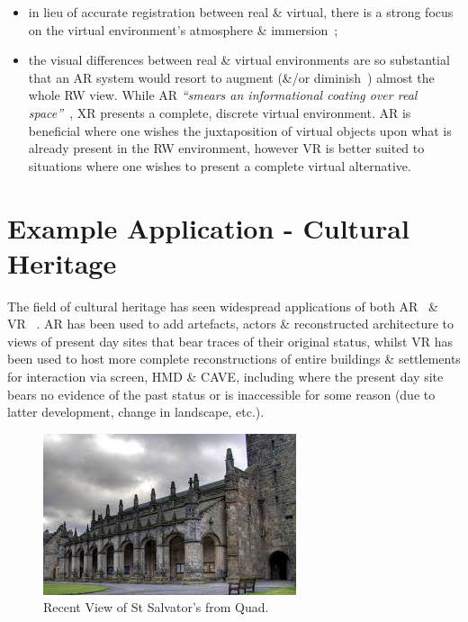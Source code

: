 \documentclass[conference]{acmsiggraph}
\begin{document}
\begin{itemize}
	\item in lieu of accurate registration between real \& virtual, there is a strong focus on the virtual environment's atmosphere \& immersion~\cite{deamicis:gamebased};
	\item the visual differences between real \& virtual environments are so substantial that an AR system would resort to augment (\&/or diminish~\cite{Mann2002}) almost the whole RW view. While AR \textit{``smears an informational coating over real space''}~\cite{Andersen}, XR presents a complete, discrete virtual environment. AR is beneficial where one wishes the juxtaposition of virtual objects upon what is already present in the RW environment, however VR is better suited to situations where one wishes to present a complete virtual alternative.
\end{itemize}

\section{Example Application - Cultural Heritage}
The field of cultural heritage has seen widespread applications of both AR~\cite{Kim2009}\cite{Wojciechowski2004} \cite{Okura2006} \cite{Magnenat-Thalmann2008a} \cite{vlahakis:archeoguide} \cite{Okura2011} \cite{Papagiannakis2004} \cite{Magnenat-Thalmann7} \cite{Papagiannakis2005} \cite{Papagiannakis2007} \cite{Papagiannakis2009} \cite{Taketomi2011} \cite{walczak:applications} \& VR~\cite{deamicis:gamebased} \cite{roussou:photorealism} \cite{cabral:x3dexperience} \cite{Roussou2002} \cite{Christou2006} \cite{willmott:largecomplex} \cite{Tzortzaki2002}. AR has been used to add artefacts, actors \& reconstructed architecture to views of present day sites that bear traces of their original status, whilst VR has been used to host more complete reconstructions of entire buildings \& settlements for interaction via screen, HMD \& CAVE, including where the present day site bears no evidence of the past status or is inaccessible for some reason (due to latter development, change in landscape, etc.).

\begin{figure}[!t]
	\centering
	\includegraphics[width=.5\textwidth]{images/frmquad}
	\caption{Recent View of St Salvator's from Quad.}
	\label{community}
\end{figure}
\end{document}
